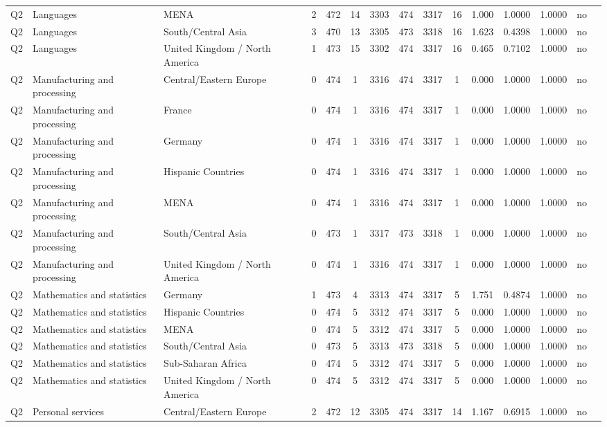 \begin{longtable}{lllrcccccccccll}
Q2 & Languages & MENA & 2 & 472 & 14 & 3303 & 474 & 3317 & 16 & 1.000 & 1.0000 & 1.0000 & no \\
Q2 & Languages & South/Central Asia & 3 & 470 & 13 & 3305 & 473 & 3318 & 16 & 1.623 & 0.4398 & 1.0000 & no \\
Q2 & Languages & United Kingdom / North America & 1 & 473 & 15 & 3302 & 474 & 3317 & 16 & 0.465 & 0.7102 & 1.0000 & no \\
Q2 & Manufacturing and processing & Central/Eastern Europe & 0 & 474 & 1 & 3316 & 474 & 3317 & 1 & 0.000 & 1.0000 & 1.0000 & no \\
Q2 & Manufacturing and processing & France & 0 & 474 & 1 & 3316 & 474 & 3317 & 1 & 0.000 & 1.0000 & 1.0000 & no \\
Q2 & Manufacturing and processing & Germany & 0 & 474 & 1 & 3316 & 474 & 3317 & 1 & 0.000 & 1.0000 & 1.0000 & no \\
Q2 & Manufacturing and processing & Hispanic Countries & 0 & 474 & 1 & 3316 & 474 & 3317 & 1 & 0.000 & 1.0000 & 1.0000 & no \\
Q2 & Manufacturing and processing & MENA & 0 & 474 & 1 & 3316 & 474 & 3317 & 1 & 0.000 & 1.0000 & 1.0000 & no \\
Q2 & Manufacturing and processing & South/Central Asia & 0 & 473 & 1 & 3317 & 473 & 3318 & 1 & 0.000 & 1.0000 & 1.0000 & no \\
Q2 & Manufacturing and processing & United Kingdom / North America & 0 & 474 & 1 & 3316 & 474 & 3317 & 1 & 0.000 & 1.0000 & 1.0000 & no \\
Q2 & Mathematics and statistics & Germany & 1 & 473 & 4 & 3313 & 474 & 3317 & 5 & 1.751 & 0.4874 & 1.0000 & no \\
Q2 & Mathematics and statistics & Hispanic Countries & 0 & 474 & 5 & 3312 & 474 & 3317 & 5 & 0.000 & 1.0000 & 1.0000 & no \\
Q2 & Mathematics and statistics & MENA & 0 & 474 & 5 & 3312 & 474 & 3317 & 5 & 0.000 & 1.0000 & 1.0000 & no \\
Q2 & Mathematics and statistics & South/Central Asia & 0 & 473 & 5 & 3313 & 473 & 3318 & 5 & 0.000 & 1.0000 & 1.0000 & no \\
Q2 & Mathematics and statistics & Sub-Saharan Africa & 0 & 474 & 5 & 3312 & 474 & 3317 & 5 & 0.000 & 1.0000 & 1.0000 & no \\
Q2 & Mathematics and statistics & United Kingdom / North America & 0 & 474 & 5 & 3312 & 474 & 3317 & 5 & 0.000 & 1.0000 & 1.0000 & no \\
Q2 & Personal services & Central/Eastern Europe & 2 & 472 & 12 & 3305 & 474 & 3317 & 14 & 1.167 & 0.6915 & 1.0000 & no \\

\end{longtable}

